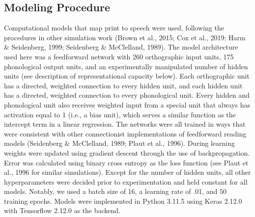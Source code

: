 \documentclass[
  ,man,floatsintext]{apa6}
\begin{document}
\subsection{Modeling Procedure}\label{modeling-procedure}

Computational models that map print to speech were used, following the procedures in other simulation work (Brown et al., 2015; Cox et al., 2019; Harm \& Seidenberg, 1999; Seidenberg \& McClelland, 1989). The model architecture used here was a feedforward network with 260 orthographic input units, 175 phonological output units, and an experimentally manipulated number of hidden units (see description of representational capacity below). Each orthographic unit has a directed, weighted connection to every hidden unit, and each hidden unit has a directed, weighted connection to every phonological unit. Every hidden and phonological unit also receives weighted input from a special unit that always has activation equal to 1 (i.e., a bias unit), which serves a similar function as the intercept term in a linear regression. The networks were all trained in ways that were consistent with other connectionist implementations of feedforward reading models (Seidenberg \& McClelland, 1989; Plaut et al., 1996). During learning weights were updated using gradient descent through the use of backpropagation. Error was calculated using binary cross entropy as the loss function (see Plaut et al., 1996 for similar simulations). Except for the number of hidden units, all other hyperparameters were decided prior to experimentation and held constant for all models. Notably, we used a batch size of 16, a learning rate of .01, and 50 training epochs. Models were implemented in Python 3.11.5 using Keras 2.12.0 with Tensorflow 2.12.0 as the backend.
\end{document}
